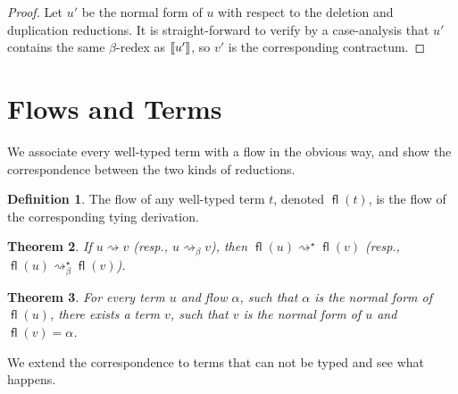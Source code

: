 \documentclass[11pt,a4paper]{article}
\theoremstyle{definition}
\newtheorem{definition}{Definition}
\theoremstyle{plain}
\newtheorem{theorem}[definition]{Theorem}
\theoremstyle{remark}
\begin{document}
\begin{proof}
	Let $u'$ be the normal form of $u$ with respect to the deletion and duplication reductions. It is straight-forward to verify by a case-analysis that $u'$ contains the same $\beta$-redex as ${\llbracket{u'}\rrbracket}$, so $v'$ is the corresponding contractum.
\end{proof}


\section{Flows and Terms}

We associate every well-typed term with a flow in the obvious way, and show the correspondence between the two kinds of reductions.

\newcommand{\fl}{{\mathop{\mathsf{fl}}}}

\begin{definition}
	The flow of any well-typed term $t$, denoted $\fl(t)$, is the flow of the corresponding tying derivation.
\end{definition}

\begin{theorem}
	If $u\rightsquigarrow v$ (resp., $u\rightsquigarrow_\beta v$), then $\fl(u)\rightsquigarrow^\star\fl(v)$ (resp., $\fl(u)\rightsquigarrow^\star_\beta\fl(v)$).
\end{theorem}

\begin{theorem}
	For every term $u$ and flow $\alpha$, such that $\alpha$ is the normal form of $\fl(u)$, there exists a term $v$, such that $v$ is the normal form of $u$ and $\fl(v)=\alpha$.
\end{theorem}

We extend the correspondence to terms that can not be typed and see what happens.
\end{document}
